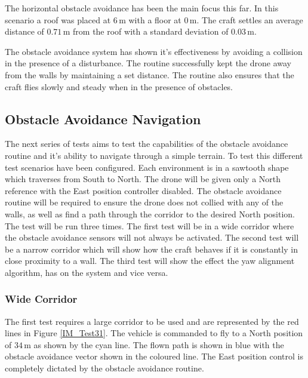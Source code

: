 		The horizontal obstacle avoidance has been the main focus this far. In this scenario a roof was placed at $6$\,m with a floor at $0$\,m. The craft settles an average distance of $0.71$\,m from the roof with a standard deviation of $0.03$\,m.
		
		The obstacle avoidance system has shown it's effectiveness by avoiding a collision in the presence of a disturbance. The routine successfully kept the drone away from the walls by maintaining a set distance. The routine also ensures that the craft flies slowly and steady when in the presence of obstacles.
		
		\subsection{Obstacle Avoidance Navigation}
		The next series of tests aims to test the capabilities of the obstacle avoidance routine and it's ability to navigate through a simple terrain. To test this different test scenarios have been configured. Each environment is in a sawtooth shape which traverses from South to North. The drone will be given only a North reference with the East position controller disabled. The obstacle avoidance routine will be required to ensure the drone does not collied with any of the walls, as well as find a path through the corridor to the desired North position. The test will be run three times. The first test will be in a wide corridor where the obstacle avoidance sensors will not always be activated. The second test will be a narrow corridor which will show how the craft behaves if it is constantly in close proximity to a wall. The third test will show the effect the yaw alignment algorithm, has on the system and vice versa.
		
			\subsubsection{Wide Corridor}
			The first test requires a large corridor to be used and are represented by the red lines in Figure \ref{IM_Test31}. The vehicle is commanded to fly to a North position of $34$\,m as shown by the cyan line. The flown path is shown in blue with the obstacle avoidance vector shown in the coloured line. The East position control is completely dictated by the obstacle avoidance routine.
			
